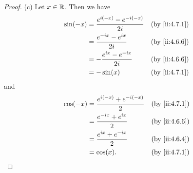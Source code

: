 \begin{proof}{(c)}
  Let \(x \in \mathbb{R}\).
  Then we have
  \begin{align*}
    \sin(-x) & = \dfrac{e^{i (-x)} - e^{- i (-x)}}{2i} &  & \by{ii:4.7.1} \\
             & = \dfrac{e^{- i x} - e^{i x}}{2i}       &  & \by{ii:4.6.6} \\
             & = -\dfrac{e^{i x} - e^{- i x}}{2i}      &  & \by{ii:4.6.6} \\
             & = -\sin(x)                              &  & \by{ii:4.7.1}
  \end{align*}
  and
  \begin{align*}
    \cos(-x) & = \dfrac{e^{i (-x)} + e^{- i (-x)}}{2} &  & \by{ii:4.7.1} \\
             & = \dfrac{e^{- i x} + e^{i x}}{2}       &  & \by{ii:4.6.6} \\
             & = \dfrac{e^{i x} + e^{- i x}}{2}       &  & \by{ii:4.6.4} \\
             & = \cos(x).                             &  & \by{ii:4.7.1}
  \end{align*}
\end{proof}

